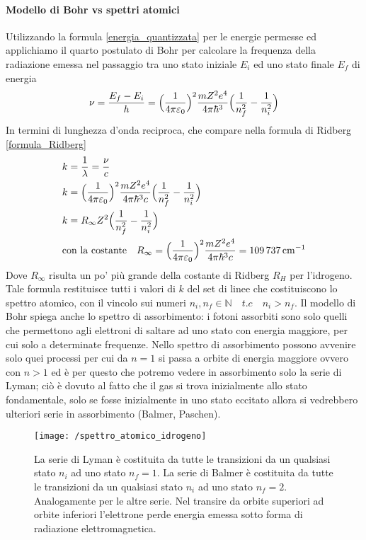 \paragraph{Modello di Bohr vs spettri atomici}
Utilizzando la formula \ref{energia_quantizzata} per le energie permesse ed applichiamo il quarto postulato di Bohr per calcolare la frequenza della radiazione emessa nel passaggio tra uno stato iniziale $E_i$ ed uno stato finale $E_f$ di energia
\begin{equation}
\nu = \frac{ E_f - E_i}{h } = \Bigl(  \frac{ 1}{4 \pi \varepsilon_0 }  \Bigr)^2 \frac{ m Z^2 e^4}{4\pi \hbar^3 } \Bigl(  \frac{ 1}{n_f^2 } - \frac{ 1}{n_i^2 }  \Bigr)
\end{equation}
In termini di lunghezza d'onda reciproca, che compare nella formula di Ridberg \ref{formula_Ridberg}
\begin{equation}
\begin{split}
& k = \frac{ 1}{\lambda } = \frac{ \nu}{c } \\
& k = \Bigl(  \frac{ 1}{4 \pi \varepsilon_0 }  \Bigr)^2 \frac{ m Z^2 e^4}{4\pi \hbar^3 c} \Bigl(  \frac{ 1}{n_f^2 } - \frac{ 1}{n_i^2 }  \Bigr) \\
& k = R_{\infty} Z^2 \Bigl(  \frac{ 1}{n_f^2 } - \frac{ 1}{n_i^2 }  \Bigr) \\
& \mbox{con la costante} \quad R_{\infty} = \Bigl(  \frac{ 1}{4 \pi \varepsilon_0 }  \Bigr)^2 \frac{ m Z^2 e^4}{4\pi \hbar^3 c} = \SI{109737}{cm^{-1}}
\end{split}
\end{equation}
Dove $R_{\infty}$ risulta un po' più grande della costante di Ridberg $R_H$ per l'idrogeno.
Tale formula restituisce tutti i valori di $k$ del set di linee che costituiscono lo spettro atomico, con il vincolo sui numeri $n_i, n_f \in \mathbb{N} \quad t.c \quad n_i > n_f$.
Il modello di Bohr spiega anche lo spettro di assorbimento: i fotoni assorbiti sono solo quelli che permettono agli elettroni di saltare ad uno stato con energia maggiore, per cui solo a determinate frequenze.
Nello spettro di assorbimento possono avvenire solo quei processi per cui da $n=1$ si passa a orbite di energia maggiore ovvero con $n>1$ ed è per questo che potremo vedere in assorbimento solo la serie di Lyman;
ciò è dovuto al fatto che il gas si trova inizialmente allo stato fondamentale, solo se fosse inizialmente in uno stato eccitato allora si vedrebbero ulteriori serie in assorbimento (Balmer, Paschen).
\begin{figure}[h]
\centering
\texttt{[image: /spettro\_atomico\_idrogeno]}
\caption{La serie di Lyman è costituita da tutte le transizioni da un qualsiasi stato $n_i$ ad uno stato $n_f = 1$.
La serie di Balmer è costituita da tutte le transizioni da un qualsiasi stato $n_i$ ad uno stato $n_f = 2$.
Analogamente per le altre serie.
Nel transire da orbite superiori ad orbite inferiori l'elettrone perde energia emessa sotto forma di radiazione elettromagnetica.}
\end{figure}

